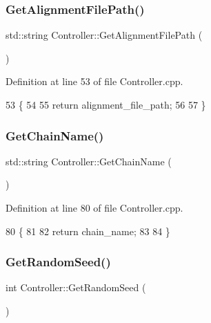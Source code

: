 \subsubsection{\texorpdfstring{Get\+Alignment\+File\+Path()}{GetAlignmentFilePath()}}
{\footnotesize\ttfamily std\+::string Controller\+::\+Get\+Alignment\+File\+Path (\begin{DoxyParamCaption}{ }\end{DoxyParamCaption})}



Definition at line 53 of file Controller.\+cpp.


\begin{DoxyCode}
53                                            \{
54   
55     \textcolor{keywordflow}{return} alignment\_file\_path;
56   
57 \}
\end{DoxyCode}
\mbox{\label{classController_a62139e7d2c85afb9046dd47528882089}} 
\subsubsection{\texorpdfstring{Get\+Chain\+Name()}{GetChainName()}}
{\footnotesize\ttfamily std\+::string Controller\+::\+Get\+Chain\+Name (\begin{DoxyParamCaption}{ }\end{DoxyParamCaption})}



Definition at line 80 of file Controller.\+cpp.


\begin{DoxyCode}
80                                    \{
81   
82     \textcolor{keywordflow}{return} chain\_name;
83   
84 \}
\end{DoxyCode}
\mbox{\label{classController_acee3589ec24f9a9432c07f2fe77f005b}} 
\subsubsection{\texorpdfstring{Get\+Random\+Seed()}{GetRandomSeed()}}
{\footnotesize\ttfamily int Controller\+::\+Get\+Random\+Seed (\begin{DoxyParamCaption}{ }\end{DoxyParamCaption})}



